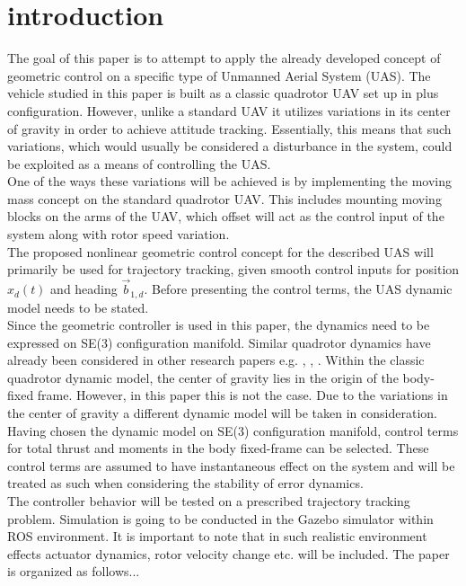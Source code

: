 \section{introduction}

The goal of this paper is to attempt to apply the already developed concept of geometric control on a specific type of Unmanned Aerial System (UAS). The vehicle studied in this paper is built as a classic quadrotor UAV set up in plus configuration. However, unlike a standard UAV it utilizes variations in its center of gravity in order to achieve attitude tracking. Essentially, this means that such variations, which would usually be considered a disturbance in the system, could be exploited as a means of controlling the UAS. \\
One of the ways these variations will be achieved is by implementing the moving mass concept on the standard quadrotor UAV. This includes mounting moving blocks on the arms of the UAV, which offset will act as the control input of the system along with rotor speed variation. \\
The proposed nonlinear geometric control concept for the described UAS will primarily be used for trajectory tracking, given smooth control inputs for position $x_d(t)$ and heading $\vec{b}_{1,d}$. Before presenting the control terms, the UAS dynamic model needs to be stated. \\
Since the geometric controller is used in this paper, the dynamics need to be expressed on SE(3) configuration manifold. Similar quadrotor dynamics have already been considered in other research papers e.g. \cite{LeeClanak4}, \cite{LeeClanak2}, \cite{LeeClanak1}. Within the classic quadrotor dynamic model, the center of gravity lies in the origin of the body-fixed frame. However, in this paper this is not the case. Due to the variations in the center of gravity a different dynamic model will be taken in consideration. \\
Having chosen the dynamic model on SE(3) configuration manifold, control terms for total thrust and moments in the body fixed-frame can be selected. These control terms are assumed to have instantaneous effect on the system and will be treated as such when considering the stability of error dynamics. \\ 
The controller behavior will be tested on a prescribed trajectory tracking problem. Simulation is going to be conducted in the Gazebo simulator within ROS environment. It is important to note that in such realistic environment effects actuator dynamics, rotor velocity change etc. will be included.
The paper is organized as follows...
